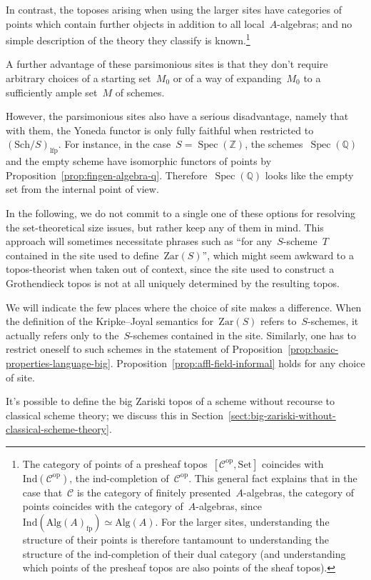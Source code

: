 \documentclass[10pt,reqno,a4paper]{amsbook}
\theoremstyle{definition}
\theoremstyle{plain}
\theoremstyle{remark}
\newcommand{\ZZ}{\mathbb{Z}}
\renewcommand{\C}{\mathcal{C}}
\newcommand{\QQ}{\mathbb{Q}}
\newcommand{\Ind}{\mathrm{Ind}}
\newcommand{\Set}{\mathrm{Set}}
\newcommand{\Zar}{\mathrm{Zar}}
\newcommand{\Sch}{\mathrm{Sch}}
\newcommand{\Alg}{\mathrm{Alg}}
\newcommand{\lfp}{\mathrm{lfp}}
\newcommand{\fp}{\mathrm{fp}}
\DeclareMathOperator{\Spec}{Spec}
\newcommand{\op}{\mathrm{op}}
\newcommand{\?}{\,{:}\,}
\renewcommand{\_}{\mathpunct{.}\,}
\begin{document}
{In contrast, the toposes arising when using the larger sites have categories of
points which contain further objects in addition to all local~$A$-algebras; and
no simple description of the theory they classify is known.\footnote{The
category of points of a presheaf topos~$[\C^\op,\Set]$ coincides
with~$\Ind(\C^\op)$, the ind-completion of~$\C^\op$. This general fact explains that
in the case that~$\C$ is the category of finitely presented~$A$-algebras,
the category of points coincides with the category of~$A$-algebras,
since~$\Ind(\Alg(A)_\fp) \simeq \Alg(A)$. For the larger sites, understanding
the structure of their points is therefore tantamount to understanding the
structure of the ind-completion of their dual category (and understanding which
points of the presheaf topos are also points of the sheaf topos).}

A further advantage of these parsimonious sites is that they don't require arbitrary
choices of a starting set~$M_0$ or of a way of expanding~$M_0$ to a sufficiently
ample set~$M$ of schemes.

However, the parsimonious sites also have a serious disadvantage, namely that
with them, the Yoneda functor is only fully faithful when restricted
to~$(\Sch/S)_\lfp$. For instance, in the case~$S = \Spec(\ZZ)$, the
schemes~$\Spec(\QQ)$ and the empty scheme have isomorphic functors of points by Proposition~\ref{prop:fingen-algebra-q}.
Therefore~$\Spec(\QQ)$ looks like the empty set from the internal point of
view.

In the following, we do not commit to a single one of these options for
resolving the set-theoretical size issues, but rather keep any of them
in mind. This approach will sometimes necessitate phrases such as ``for
any~$S$-scheme~$T$ contained in the site used to define~$\Zar(S)$'', which might
seem awkward to a topos-theorist when taken out of context, since
the site used to construct a Grothendieck topos is not at all uniquely
determined by the resulting topos.

We will indicate the few places where the choice of site makes a difference.
When the definition of the Kripke--Joyal semantics for~$\Zar(S)$ refers
to~$S$-schemes, it actually refers only to the~$S$-schemes contained in the
site. Similarly, one has to restrict oneself to such schemes in the statement
of Proposition~\ref{prop:basic-properties-language-big}.
Proposition~\ref{prop:affl-field-informal} holds for any choice of site.

It's possible to define the big Zariski topos of a scheme without recourse to
classical scheme theory; we discuss this in
Section~\ref{sect:big-zariski-without-classical-scheme-theory}.

}
\end{document}

